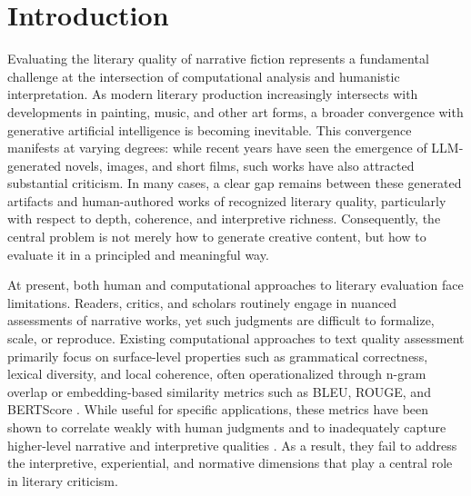 \section{Introduction}\label{sec:introduction}


Evaluating the literary quality of narrative fiction represents a fundamental challenge at the intersection of computational analysis and humanistic interpretation. As modern literary production increasingly intersects with developments in painting, music, and other art forms, a broader convergence with generative artificial intelligence is becoming inevitable. This convergence manifests at varying degrees: while recent years have seen the emergence of LLM-generated novels, images, and short films, such works have also attracted substantial criticism. In many cases, a clear gap remains between these generated artifacts and human-authored works of recognized literary quality, particularly with respect to depth, coherence, and interpretive richness. Consequently, the central problem is not merely how to generate creative content, but how to evaluate it in a principled and meaningful way.

At present, both human and computational approaches to literary evaluation face limitations. Readers, critics, and scholars routinely engage in nuanced assessments of narrative works, yet such judgments are difficult to formalize, scale, or reproduce. Existing computational approaches to text quality assessment primarily focus on surface-level properties such as grammatical correctness, lexical diversity, and local coherence, often operationalized through n-gram overlap or embedding-based similarity metrics such as BLEU, ROUGE, and BERTScore \cite{papineni2002bleu,lin2004rouge,zhang2019bertscore}. While useful for specific applications, these metrics have been shown to correlate weakly with human judgments and to inadequately capture higher-level narrative and interpretive qualities \cite{novikova2017we,reiter2018structured}. As a result, they fail to address the interpretive, experiential, and normative dimensions that play a central role in literary criticism.


